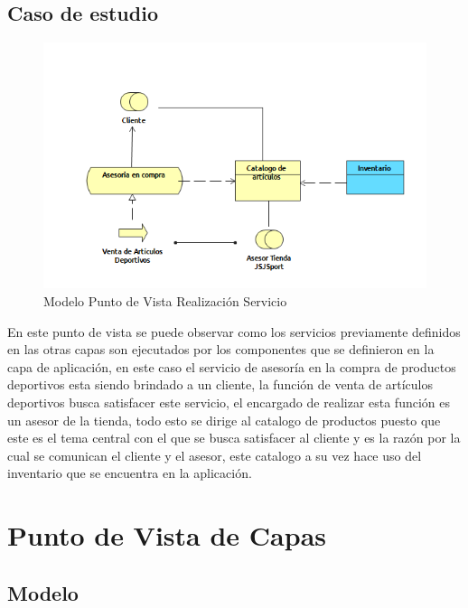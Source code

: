 \subsection{Caso de estudio}

\begin{figure}[th!]
	\centering
	\includegraphics[width=0.7\linewidth]{arquitectura/imagenes/PuntoVistaRealizacionServicio}
	\caption{Modelo Punto de Vista Realización Servicio}
	\label{modeloRealizacionServicio}
\end{figure}

En este punto de vista se puede observar como los servicios previamente definidos en las otras capas son ejecutados por los componentes que se definieron en la capa de aplicación, en este caso el servicio de asesoría en la compra de productos deportivos esta siendo brindado a un cliente, la función de venta de artículos deportivos busca satisfacer este servicio, el encargado de realizar esta función es un asesor de la tienda, todo esto se dirige al catalogo de productos puesto que este es el tema central con el que se busca satisfacer al cliente y es la razón por la cual se comunican el cliente y el asesor, este catalogo a su vez hace uso del inventario que se encuentra en la aplicación.

\newpage

\section{Punto de Vista de Capas}

\subsection{Modelo}

